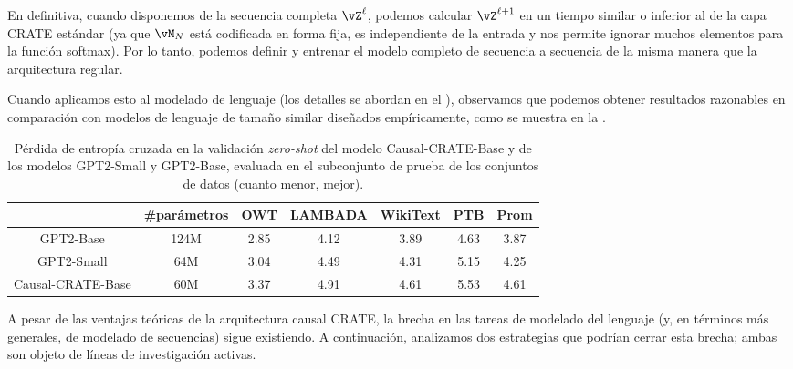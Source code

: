 \documentclass[../../book-main.tex]{subfiles}
\begin{document}
En definitiva, cuando disponemos de la secuencia completa
\(\vZ^{\ell}\), podemos calcular \(\vZ^{\ell + 1}\) en un tiempo similar
o inferior al de la capa CRATE estándar (ya que \(\vM_{N}\) está
    codificada en forma fija, es independiente de la entrada y nos permite ignorar muchos elementos
para la función softmax). Por lo tanto, podemos definir y entrenar el modelo
completo de secuencia a secuencia de la misma manera que la arquitectura regular.

Cuando aplicamos esto al modelado de lenguaje (los detalles se abordan en el
), observamos que podemos obtener resultados razonables
en comparación con modelos de lenguaje de tamaño similar diseñados empíricamente,
como se muestra en la .

\begin{table}[t!]
    \small
    \caption{\small Pérdida de entropía cruzada en la validación \textit{zero-shot} del
        modelo Causal-CRATE-Base y de los modelos GPT2-Small y GPT2-Base,
        evaluada en el subconjunto de prueba de los conjuntos de datos (cuanto menor, mejor).
    }
    \centering
    \resizebox{1\columnwidth}{!}
    {
        \begin{tabular}{ccccccc}
            \hline
            & \#parámetros & OWT & LAMBADA &
            WikiText & PTB & Prom \\
            \hline
            \hline
            GPT2-Base  & {124M} & 2.85 & 4.12 & 3.89 & 4.63 & 3.87 \\
            {GPT2-Small } &  {64M} & {3.04} & {4.49} & {4.31} &
            {5.15} & {4.25} \\
            Causal-CRATE-Base & {60M} & 3.37 & 4.91 & 4.61 & 5.53 & 4.61 \\
            \hline
        \end{tabular}
    }
    \label{tab:causal-crate-results}
\end{table}

A pesar de las ventajas teóricas de la arquitectura causal CRATE,
la brecha en las tareas de modelado del lenguaje (y, en términos más generales, de modelado de secuencias)
sigue existiendo. A continuación, analizamos dos estrategias que podrían
cerrar esta brecha; ambas son objeto de líneas de investigación activas.
\end{document}
